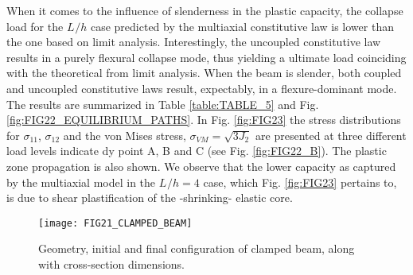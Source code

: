 When it comes to the influence of slenderness in the plastic capacity, the 
collapse 
load for the $L^{}/h$ case predicted by the multiaxial constitutive law is 
lower than the one based on limit analysis. Interestingly, the uncoupled 
constitutive law results in a purely flexural collapse mode, thus yielding a 
ultimate load coinciding with the theoretical from limit analysis. When the 
beam is slender, both coupled and uncoupled constitutive laws result, 
expectably, in a flexure-dominant mode. The results are summarized in Table 
\ref{table:TABLE_5} and Fig. \ref{fig:FIG22_EQUILIBRIUM_PATHS}. In Fig. 
\ref{fig:FIG23} the stress distributions for $\sigma_{11}$, $\sigma_{12}$ and 
the von Mises stress, $\sigma_{VM}=\sqrt{3J_2}$ are presented at three 
different load levels indicate dy point A, B and C (see Fig. 
\ref{fig:FIG22_B}). 
The plastic zone propagation is also shown. We observe that the lower 
capacity as captured by the multiaxial model in the $L^{}/h=4$ case, which Fig. 
\ref{fig:FIG23} pertains to, is due to shear plastification of the -shrinking- 
elastic core.

\begin{figure}
	\centering
	\texttt{[image: FIG21\_CLAMPED\_BEAM]}
	\caption{Geometry, initial and final configuration of clamped beam, along 
		with cross-section dimensions.}
	\label{fig:FIG21_CLAMPED_BEAM}
\end{figure}

\noindent{}

